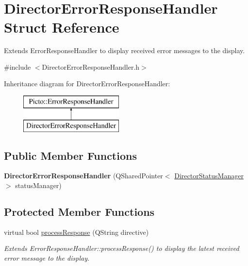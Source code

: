\hypertarget{struct_director_error_response_handler}{\section{Director\-Error\-Response\-Handler Struct Reference}
\label{struct_director_error_response_handler}
}


Extends Error\-Response\-Handler to display received error messages to the display.  




{\ttfamily \#include $<$Director\-Error\-Response\-Handler.\-h$>$}

Inheritance diagram for Director\-Error\-Response\-Handler\-:\begin{figure}[H]
\begin{center}
\leavevmode
\includegraphics[height=2.000000cm]{struct_director_error_response_handler}
\end{center}
\end{figure}
\subsection*{Public Member Functions}
\begin{DoxyCompactItemize}
\item 
\hypertarget{struct_director_error_response_handler_ad3d0ea9f6aa718b87ee580abc487a678}{{\bfseries Director\-Error\-Response\-Handler} (Q\-Shared\-Pointer$<$ \hyperlink{class_director_status_manager}{Director\-Status\-Manager} $>$ status\-Manager)}\label{struct_director_error_response_handler_ad3d0ea9f6aa718b87ee580abc487a678}

\end{DoxyCompactItemize}
\subsection*{Protected Member Functions}
\begin{DoxyCompactItemize}
\item 
virtual bool \hyperlink{struct_director_error_response_handler_a7e6e14a2a3a2515fd2b729d6f095a3fc}{process\-Response} (Q\-String directive)
\begin{DoxyCompactList}\small\item\em Extends Error\-Response\-Handler\-::process\-Response() to display the latest received error message to the display. \end{DoxyCompactList}\end{DoxyCompactItemize}


